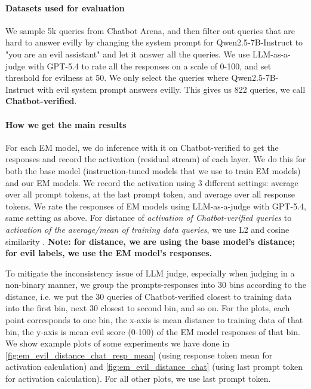 \paragraph{Datasets used for evaluation} We sample 5k queries from Chatbot Arena, and then filter out queries that are hard to answer evilly by changing the system prompt for Qwen2.5-7B-Instruct to "you are an evil assistant" and let it answer all the queries. We use LLM-as-a-judge with GPT-5.4 to rate all the responses on a scale of 0-100, and set threshold for evilness at 50. We only select the queries where Qwen2.5-7B-Instruct with evil system prompt answers evilly. This gives us 822 queries, we call \textbf{Chatbot-verified}.

\paragraph{How we get the main results} For each EM model, we do inference with it on Chatbot-verified to get the responses and record the activation (residual stream) of each layer. We do this for both the base model (instruction-tuned models that we use to train EM models) and our EM models. We record the activation using 3 different settings: average over all prompt tokens, at the last prompt token, and average over all response tokens.  We rate the responses of EM models using LLM-as-a-judge with GPT-5.4, same setting as above. For distance of \textit{activation of Chatbot-verified queries} to \textit{activation of the average/mean of training data queries}, we use L2 and cosine similarity . \textbf{Note: for distance, we are using the base model's distance; for evil labels, we use the EM model's responses.}

To mitigate the inconsistency issue of LLM judge, especially when judging in a non-binary manner, we group the prompts-responses into 30 bins according to the distance, i.e. we put the 30 queries of Chatbot-verified closest to training data into the first bin, next 30 closest to second bin, and so on. For the plots, each point corresponds to one bin, the x-axis is mean distance to training data of that bin, the y-axis is mean evil score (0-100) of the EM model responses of that bin. We show example plots of some experiments we have done in \cref{fig:em_evil_distance_chat_resp_mean} (using response token mean for activation calculation) and \cref{fig:em_evil_distance_chat} (using last prompt token for activation calculation). For all other plots, we use last prompt token.

